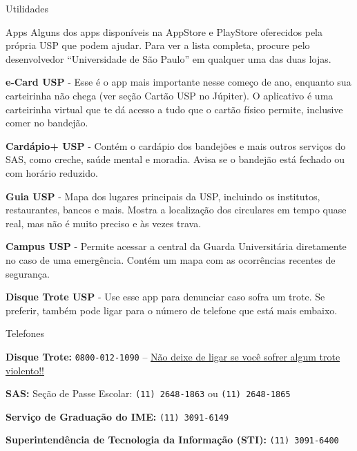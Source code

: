 \begin{secao}{Utilidades}
\begin{subsecao}{Apps}
Alguns dos apps disponíveis na AppStore e PlayStore oferecidos pela própria USP
que podem ajudar. Para ver a lista completa, procure pelo desenvolvedor
``Universidade de São Paulo'' em qualquer uma das duas lojas.

{\bf e-Card USP} - Esse é o app mais importante nesse começo de ano, enquanto
sua carteirinha não chega (ver seção Cartão USP no Júpiter). O aplicativo é uma
carteirinha virtual que te dá acesso a tudo que o cartão físico permite,
inclusive comer no bandejão.

{\bf Cardápio+ USP} - Contém o cardápio dos bandejões e mais outros serviços
do SAS, como creche, saúde mental e moradia. Avisa se o bandejão está fechado
ou com horário reduzido.

{\bf Guia USP} - Mapa dos lugares principais da USP, incluindo os institutos,
restaurantes, bancos e mais. Mostra a localização dos circulares em tempo quase
real, mas não é muito preciso e às vezes trava.

{\bf Campus USP} - Permite acessar a central da Guarda Universitária
diretamente no caso de uma emergência. Contém um mapa com as ocorrências
recentes de segurança.

{\bf Disque Trote USP} - Use esse app para denunciar caso sofra um trote. Se
preferir, também pode ligar para o número de telefone que está mais embaixo.

\end{subsecao}

\begin{subsecao}{Telefones}

{\bf Disque Trote:} {\tt 0800-012-1090} --
\underline{Não deixe de ligar se você sofrer algum trote violento!!}

{\bf SAS:} Seção de Passe Escolar: {\tt (11) 2648-1863} ou {\tt (11) 2648-1865}

{\bf Serviço de Graduação do IME:} {\tt (11) 3091-6149}

{\bf Superintendência de Tecnologia da Informação (STI):} {\tt (11) 3091-6400}


\end{subsecao}
\end{secao}
